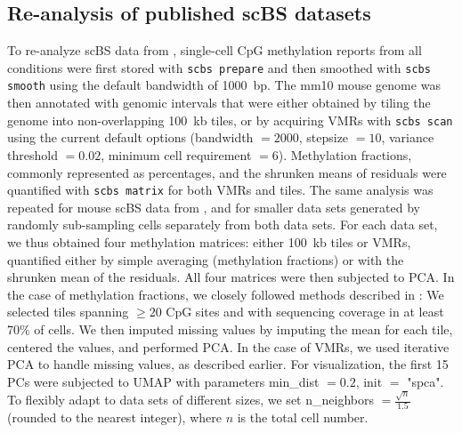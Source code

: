 \documentclass[twocolumn,10pt]{article}
\begin{document}
\subsection{Re-analysis of published scBS datasets}
To re-analyze scBS data from \citet{kremer_scnmt}, single-cell CpG methylation reports from all conditions were first stored with \texttt{scbs prepare} and then smoothed with \texttt{scbs smooth} using the default bandwidth of 1000~bp.
The mm10 mouse genome was then annotated with genomic intervals that were either obtained by tiling the genome into non-overlapping 100~kb tiles, or by acquiring VMRs with \texttt{scbs scan} using the current default options (bandwidth $=2000$, stepsize $=10$, variance threshold $= 0.02$, minimum cell requirement $=6$).
Methylation fractions, commonly represented as percentages, and the shrunken means of residuals were quantified with \texttt{scbs matrix} for both VMRs and tiles.
The same analysis was repeated for mouse scBS data from \citet{luo2017single}, and for smaller data sets generated by randomly sub-sampling cells separately from both data sets.
For each data set, we thus obtained four methylation matrices:
either 100~kb tiles or VMRs, quantified either by simple averaging (methylation fractions) or with the shrunken mean of the residuals.
All four matrices were then subjected to PCA.
In the case of methylation fractions, we closely followed methods described in \citet{luo2017single}:
We selected tiles spanning $\ge20$ CpG sites and with sequencing coverage in at least 70\% of cells.
We then imputed missing values by imputing the mean for each tile, centered the values, and performed PCA.
In the case of VMRs, we used iterative PCA to handle missing values, as described earlier.
For visualization, the first 15 PCs were subjected to UMAP with parameters min\_dist $=0.2$, init $=$ "spca".
To flexibly adapt to data sets of different sizes, we set n\_neighbors  $=\frac{\sqrt{n}}{1.5}$ (rounded to the nearest integer), where $n$ is the total cell number.
\end{document}
